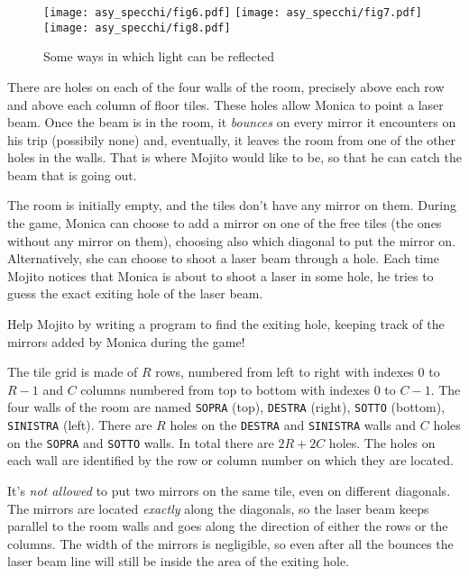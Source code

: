 \begin{figure}[H]
    \begin{center}
        \texttt{[image: asy\_specchi/fig6.pdf]}
        \texttt{[image: asy\_specchi/fig7.pdf]}
        \texttt{[image: asy\_specchi/fig8.pdf]}
    \end{center}
    \caption{Some ways in which light can be reflected}
\end{figure}

There are holes on each of the four walls of the room, precisely above each row and above each column of floor tiles. These holes allow Monica to point a laser beam.
Once the beam is in the room, it \emph{bounces} on every mirror it encounters on his trip (possibily none) and, eventually, it leaves the room from one of the other holes in the walls.
That is where Mojito would like to be, so that he can catch the beam that is going out.

The room is initially empty, and the tiles don't have any mirror on them.
During the game, Monica can choose to add a mirror on one of the free tiles (the ones without any mirror on them), choosing also which diagonal to put the mirror on. Alternatively, she can choose to shoot a laser beam through a hole.
Each time Mojito notices that Monica is about to shoot a laser in some hole, he tries to guess the exact exiting hole of the laser beam.

Help Mojito by writing a program to find the exiting hole, keeping track of the mirrors added by Monica during the game!

\begin{mdframed}[backgroundcolor=black!10,rightline=false,leftline=false]

\Specs

\small

The tile grid is made of $R$ rows, numbered from left to right with indexes $0$ to $R-1$ and $C$ columns numbered from top to bottom with indexes $0$ to $C-1$.
The four walls of the room are named \texttt{SOPRA} (top), \texttt{DESTRA} (right), \texttt{SOTTO} (bottom), \texttt{SINISTRA} (left).
There are $R$ holes on the \texttt{DESTRA} and \texttt{SINISTRA} walls and $C$ holes on the \texttt{SOPRA} and \texttt{SOTTO} walls. In total there are $2R + 2C$ holes.
The holes on each wall are identified by the row or column number on which they are located.

\pagebreak
It's \emph{not allowed} to put two mirrors on the same tile, even on different diagonals.
The mirrors are located \emph{exactly} along the diagonals, so the laser beam keeps parallel to the room walls and goes along the direction of either the rows or the columns.
The width of the mirrors is negligible, so even after all the bounces the laser beam line will still be inside the area of the exiting hole.

\end{mdframed}

